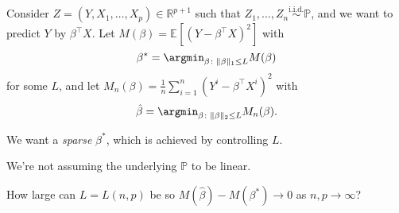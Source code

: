 \begin{eg}
	Consider \(Z = (Y, X_1, \dots , X_p) \in \mathbb{R} ^{p + 1}\) such that \(Z_1, \dots , Z_n \overset{\text{i.i.d.} }{\sim } \mathbb{P} \), and we want to predict \(Y\) by \(\beta ^{\top} X\). Let \(M(\beta ) = \mathbb{E}_{}\left[(Y - \beta ^{\top} X) ^2 \right] \) with
	\[
		\beta ^{\ast} = \argmin_{\beta \colon \lVert \beta \rVert _1 \leq L}  M(\beta )
	\]
	for some \(L\), and let \(M_n(\beta ) = \frac{1}{n} \sum_{i=1}^{n} (Y^i - \beta ^{\top} X^i)^2\) with
	\[
		\hat{\beta} = \argmin_{\beta \colon \lVert \beta  \rVert _2 \leq L} M_n(\beta ).
	\]

	\begin{intuition}
		We want a \emph{sparse} \(\beta ^{\ast} \), which is achieved by controlling \(L\).
	\end{intuition}

	\begin{note}
		We're not assuming the underlying \(\mathbb{P} \) to be linear.
	\end{note}

	\begin{problem*}[Persistency]
		How large can \(L = L(n, p)\) be so \(M(\hat{\beta} ) - M(\beta ^{\ast} ) \to 0\) as \(n, p \to \infty \)?
	\end{problem*}


\end{eg}
